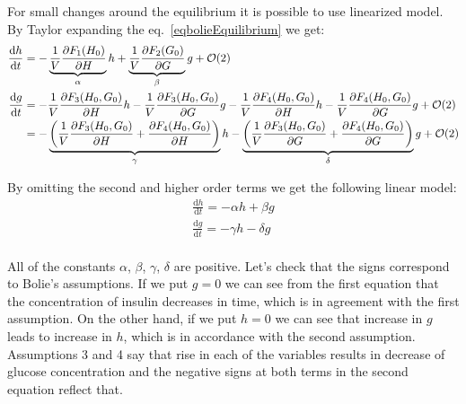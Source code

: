 \documentclass{article}
\providecommand{\m}[1]{\ensuremath{\mathrm{#1}}}
\providecommand{\p}[1]{\ensuremath{\partial #1}}
\begin{document}
For small changes around the equilibrium it is possible to use linearized model. By Taylor expanding the eq.~\ref{eqbolieEquilibrium} we get:
\begin{align*}
\frac{\m{d}h}{\m{d}t}&=-\underbrace{%
		\frac{1}{V}\frac{\p F_1(H_0)}{\p H}}_{\alpha}h+%
%
\underbrace{%
		\frac{1}{V}\frac{\p F_2(G_0)}{\p G}}_{\beta}g+\mathcal{O}(2) \\%
%
\frac{\m{d}g}{\m{d}t}&=-\frac{1}{V}\frac{\p F_3(H_0, G_0)}{\p H}h- \frac{1}{V}\frac{\p F_3(H_0, G_0)}{\p G}g-\frac{1}{V}\frac{\p F_4(H_0, G_0)}{\p H}h-\frac{1}{V}\frac{\p F_4(H_0, G_0)}{\p G}g+\mathcal{O}(2)\\%
%
&=-\underbrace{%
\left(\frac{1}{V}\frac{\p F_3(H_0, G_0)}{\p H}+\frac{\p F_4(H_0, G_0)}{\p H}\right)}_{\gamma}h%
-\underbrace{%
\left(\frac{1}{V}\frac{\p F_3(H_0, G_0)}{\p G}+\frac{\p F_4(H_0, G_0)}{\p G}\right)}_{\delta} g+\mathcal{O}(2)\end{align*}

By omitting the second and higher order terms we get the following linear model:
\begin{equation}
\label{eqLinearized}
\begin{aligned}
\frac{\m{d}h}{\m{d}t}=-\alpha h + \beta g\\
\frac{\m{d}g}{\m{d}t}=-\gamma h - \delta g\\
\end{aligned}
\end{equation}

All of the constants $\alpha$, $\beta$, $\gamma$, $\delta$ are positive. Let's check that the signs correspond to Bolie's assumptions. If we put $g=0$ we can see from the first equation that the concentration of insulin decreases in time, which is in agreement with the first assumption.
On the other hand, if we put $h=0$ we can see that increase in $g$ leads to increase in $h$, which is in accordance with the second assumption.
Assumptions 3 and 4 say that rise in each of the variables results in   decrease of glucose concentration and the negative signs at both terms in the second equation reflect that.   
\end{document}
